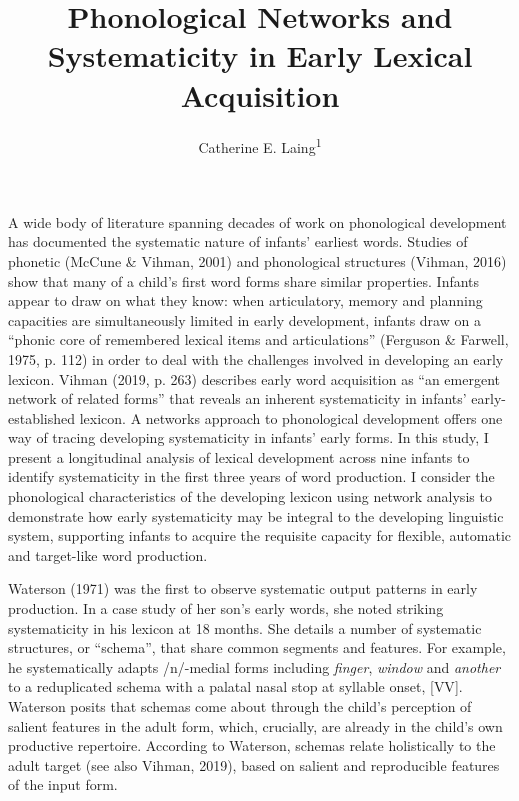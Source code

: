 \documentclass[
  english,
  man,floatsintext]{apa6}
\title{Phonological Networks and Systematicity in Early Lexical Acquisition}
\author{Catherine E. Laing\textsuperscript{1}}
\date{}
\affiliation{\vspace{0.5cm}\textsuperscript{1} University of York, York, UK}
\begin{document}
\maketitle

A wide body of literature spanning decades of work on phonological development has documented the systematic nature of infants' earliest words. Studies of phonetic (McCune \& Vihman, 2001) and phonological structures (Vihman, 2016) show that many of a child's first word forms share similar properties. Infants appear to draw on what they know: when articulatory, memory and planning capacities are simultaneously limited in early development, infants draw on a \enquote{phonic core of remembered lexical items and articulations} (Ferguson \& Farwell, 1975, p. 112) in order to deal with the challenges involved in developing an early lexicon. Vihman (2019, p. 263) describes early word acquisition as \enquote{an emergent network of related forms} that reveals an inherent systematicity in infants' early-established lexicon. A networks approach to phonological development offers one way of tracing developing systematicity in infants' early forms. In this study, I present a longitudinal analysis of lexical development across nine infants to identify systematicity in the first three years of word production. I consider the phonological characteristics of the developing lexicon using network analysis to demonstrate how early systematicity may be integral to the developing linguistic system, supporting infants to acquire the requisite capacity for flexible, automatic and target-like word production.

Waterson (1971) was the first to observe systematic output patterns in early production. In a case study of her son's early words, she noted striking systematicity in his lexicon at 18 months. She details a number of systematic structures, or \enquote{schema}, that share common segments and features. For example, he systematically adapts /n/-medial forms including \emph{finger}, \emph{window} and \emph{another} to a reduplicated schema with a palatal nasal stop at syllable onset, {[}VV{]}. Waterson posits that schemas come about through the child's perception of salient features in the adult form, which, crucially, are already in the child's own productive repertoire. According to Waterson, schemas relate holistically to the adult target (see also Vihman, 2019), based on salient and reproducible features of the input form.
\end{document}
